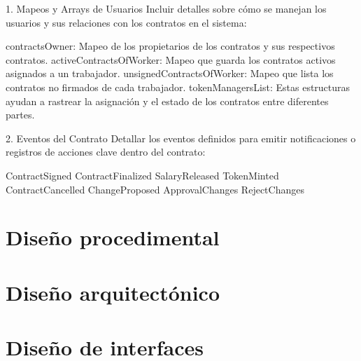 1. Mapeos y Arrays de Usuarios
Incluir detalles sobre cómo se manejan los usuarios y sus relaciones con los contratos en el sistema:

contractsOwner: Mapeo de los propietarios de los contratos y sus respectivos contratos.
activeContractsOfWorker: Mapeo que guarda los contratos activos asignados a un trabajador.
unsignedContractsOfWorker: Mapeo que lista los contratos no firmados de cada trabajador.
tokenManagersList:
Estas estructuras ayudan a rastrear la asignación y el estado de los contratos entre diferentes partes.



2. Eventos del Contrato
Detallar los eventos definidos para emitir notificaciones o registros de acciones clave dentro del contrato:

ContractSigned
ContractFinalized
SalaryReleased
TokenMinted
ContractCancelled
ChangeProposed
ApprovalChanges
RejectChanges

\section{Diseño procedimental}



\section{Diseño arquitectónico}



\section{Diseño de interfaces}

